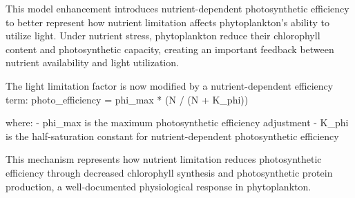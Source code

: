 This model enhancement introduces nutrient-dependent photosynthetic efficiency to better represent how nutrient limitation affects phytoplankton's ability to utilize light. Under nutrient stress, phytoplankton reduce their chlorophyll content and photosynthetic capacity, creating an important feedback between nutrient availability and light utilization.

The light limitation factor is now modified by a nutrient-dependent efficiency term:
photo_efficiency = phi_max * (N / (N + K_phi))

where:
- phi_max is the maximum photosynthetic efficiency adjustment
- K_phi is the half-saturation constant for nutrient-dependent photosynthetic efficiency

This mechanism represents how nutrient limitation reduces photosynthetic efficiency through decreased chlorophyll synthesis and photosynthetic protein production, a well-documented physiological response in phytoplankton.
